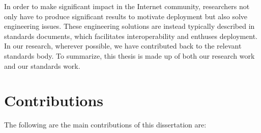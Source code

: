 In order to make significant impact in the Internet community, researchers not
only have to produce significant results to motivate deployment but also solve
engineering issues. These engineering solutions are instead typically
described in standards documents, which facilitates interoperability and
enthuses deployment. In our research, wherever possible, we have contributed
back to the relevant standards body. To summarize, this thesis is made up
of both our research work and our standards work.


\section{Contributions}

The following are the main contributions of this dissertation are:

